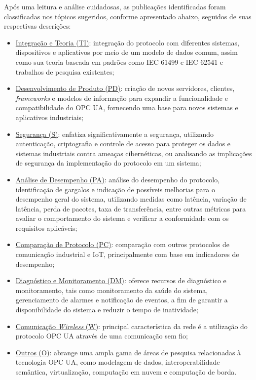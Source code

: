     Após uma leitura e análise cuidadosas, as publicações identificadas foram classificadas nos tópicos sugeridos, conforme apresentado abaixo, seguidos de suas respectivas descrições:

    \begin{itemize}
        \item \underline{Integração e Teoria (TI)}: integração do protocolo com diferentes sistemas, dispositivos e aplicativos por meio de um modelo de dados comum, assim como sua teoria baseada em padrões como IEC 61499 e IEC 62541 e trabalhos de pesquisa existentes;
        \item \underline{Desenvolvimento de Produto (PD)}: criação de novos servidores, clientes, \textit{frameworks} e modelos de informação para expandir a funcionalidade e compatibilidade do OPC UA, fornecendo uma base para novos sistemas e aplicativos industriais;
        \item \underline{Segurança (S)}: enfatiza significativamente a segurança, utilizando autenticação, criptografia e controle de acesso para proteger os dados e sistemas industriais contra ameaças cibernéticas, ou analisando as implicações de segurança da implementação do protocolo em um sistema;
        \item \underline{Análise de Desempenho (PA)}: análise do desempenho do protocolo, identificação de gargalos e indicação de possíveis melhorias para o desempenho geral do sistema, utilizando medidas como latência, variação de latência, perda de pacotes, taxa de transferência, entre outras métricas para avaliar o comportamento do sistema e verificar a conformidade com os requisitos aplicáveis;
        \item \underline{Comparação de Protocolo (PC)}: comparação com outros protocolos de comunicação industrial e IoT, principalmente com base em indicadores de desempenho;
        \item \underline{Diagnóstico e Monitoramento (DM)}: oferece recursos de diagnóstico e monitoramento, tais como monitoramento da saúde do sistema, gerenciamento de alarmes e notificação de eventos, a fim de garantir a disponibilidade do sistema e reduzir o tempo de inatividade;
        \item \underline{Comunicação \textit{Wireless} (W)}: principal característica da rede é a utilização do protocolo OPC UA através de uma comunicação sem fio;
        \item \underline{Outros (O)}: abrange uma ampla gama de áreas de pesquisa relacionadas à tecnologia OPC UA, como modelagem de dados, interoperabilidade semântica, virtualização, computação em nuvem e computação de borda.
    \end{itemize}

